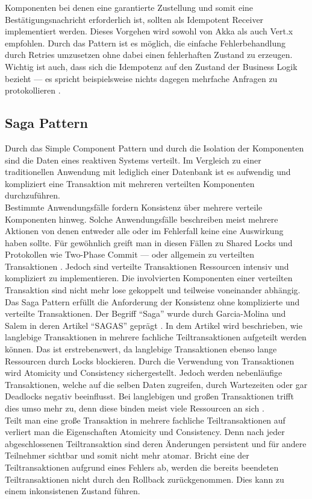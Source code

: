 Komponenten bei denen eine garantierte Zustellung und somit eine Bestätigungsnachricht erforderlich ist, sollten als Idempotent Receiver implementiert werden. Dieses Vorgehen wird sowohl von Akka als auch Vert.x empfohlen. Durch das Pattern ist es möglich, die einfache Fehlerbehandlung durch Retries umzusetzen ohne dabei einen fehlerhaften Zustand zu erzeugen. Wichtig ist auch, dass sich die Idempotenz auf den Zustand der Business Logik bezieht --- es spricht beispielsweise nichts dagegen mehrfache Anfragen zu protokollieren \cite[S.~216]{newman_building_2015}.

\pagebreak

\subsection{Saga Pattern}\label{subsec:saga-pattern}
Durch das Simple Component Pattern und durch die Isolation der Komponenten sind die Daten eines reaktiven Systems verteilt. Im Vergleich zu einer traditionellen Anwendung mit lediglich einer Datenbank ist es aufwendig und kompliziert eine Transaktion mit mehreren verteilten Komponenten durchzuführen.\\
Bestimmte Anwendungsfälle fordern Konsistenz über mehrere verteile Komponenten hinweg. Solche Anwendungsfälle beschreiben meist mehrere Aktionen von denen entweder alle oder im Fehlerfall keine eine Auswirkung haben sollte. Für gewöhnlich greift man in diesen Fällen zu Shared Locks und Protokollen wie Two-Phase Commit --- oder allgemein zu verteilten Transaktionen \cite{mccaffrey_goto_2015}. Jedoch sind verteilte Transaktionen Ressourcen intensiv und kompliziert zu implementieren. Die involvierten Komponenten einer verteilten Transaktion sind nicht mehr lose gekoppelt und teilweise voneinander abhängig.\\
Das Saga Pattern erfüllt die Anforderung der Konsistenz ohne komplizierte und verteilte Transaktionen. Der Begriff \enquote{Saga} wurde durch Garcia-Molina und Salem in deren Artikel \enquote{SAGAS} geprägt \cite{garcia-molina_sagas_1987}. In dem Artikel wird beschrieben, wie langlebige Transaktionen in mehrere fachliche Teiltransaktionen aufgeteilt werden können. Das ist erstrebenswert, da langlebige Transaktionen ebenso lange Ressourcen durch Locks blockieren. Durch die Verwendung von Transaktionen wird Atomicity und Consistency sichergestellt. Jedoch werden nebenläufige Transaktionen, welche auf die selben Daten zugreifen, durch Wartezeiten oder gar Deadlocks negativ beeinflusst. Bei langlebigen und großen Transaktionen trifft dies umso mehr zu, denn diese binden meist viele Ressourcen an sich \cite[S.~307]{kuhn_reactive_2015}.\\
Teilt man eine große Transaktion in mehrere fachliche Teiltransaktionen auf verliert man die Eigenschaften Atomicity und Consistency. Denn nach jeder abgeschlossenen Teiltransaktion sind deren Änderungen persistent und für andere Teilnehmer sichtbar und somit nicht mehr atomar. Bricht eine der Teiltransaktionen aufgrund eines Fehlers ab, werden die bereits beendeten Teiltransaktionen nicht durch den Rollback zurückgenommen. Dies kann zu einem inkonsistenen Zustand \mbox{führen}.

